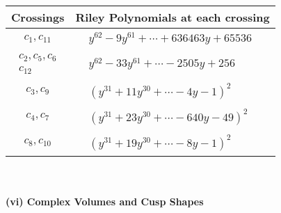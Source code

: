 \documentclass[1p]{elsarticle_modified}
\theoremstyle{definition}
\begin{document}
\begin{tabular}{m{50pt}|m{274pt}}
Crossings & \hspace{64pt}Riley Polynomials at each crossing \\
\hline $$\begin{aligned}c_{1},c_{11}\end{aligned}$$&$\begin{aligned}
&y^{62}-9 y^{61}+\cdots+636463 y+65536
\end{aligned}$\\
\hline $$\begin{aligned}c_{2},c_{5},c_{6}\\c_{12}\end{aligned}$$&$\begin{aligned}
&y^{62}-33 y^{61}+\cdots-2505 y+256
\end{aligned}$\\
\hline $$\begin{aligned}c_{3},c_{9}\end{aligned}$$&$\begin{aligned}
&(y^{31}+11 y^{30}+\cdots-4 y-1)^{2}
\end{aligned}$\\
\hline $$\begin{aligned}c_{4},c_{7}\end{aligned}$$&$\begin{aligned}
&(y^{31}+23 y^{30}+\cdots-640 y-49)^{2}
\end{aligned}$\\
\hline $$\begin{aligned}c_{8},c_{10}\end{aligned}$$&$\begin{aligned}
&(y^{31}+19 y^{30}+\cdots-8 y-1)^{2}
\end{aligned}$\\
\hline
\end{tabular}\\~\\
\newpage\flushleft \textbf{(vi) Complex Volumes and Cusp Shapes}
\end{document}

